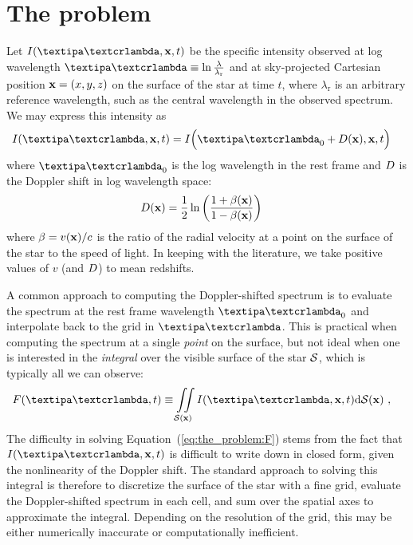 \documentclass[modern]{aastex631}
\begin{document}
\section{The problem}
\label{sec:the_problem}
%
Let $I(\lnlam, \x, t)$ be the specific intensity observed at log wavelength $\lnlam \equiv \ln\frac{\lambda}{\lambda_\mathrm{r}}$ and at sky-projected Cartesian position ${\mathbf{x}} = (x, y, z)$ on the surface of the star at time $t$, where $\lambda_\mathrm{r}$ is an arbitrary reference wavelength, such as the central wavelength in the observed spectrum.
We may express this intensity as
%
\begin{align}
    \label{eq:the_problem:Ixi}
    I(\lnlam, \x, t) & =
    I\Big(\lnlam_0 + \D(\x), \x, t\Big)
\end{align}
%
where $\lnlam_0$ is the log wavelength in the rest frame and $D$ is the Doppler shift in log wavelength space:
%
\begin{align}
    \label{eq:the_problem:D}
    D({\mathbf{x}})
     & =
    \frac{1}{2}\ln\left(
    \frac{1 + \beta({\mathbf{x}})}{1 - \beta({\mathbf{x}})}
    \right)
\end{align}
%
where $\beta = v({\mathbf{x}}) / c$ is the ratio of the radial velocity at a point on the surface of the star to the speed of light.
In keeping with the literature, we take positive values of $v$ (and $D$) to mean redshifts.

A common approach to computing the Doppler-shifted spectrum is to evaluate the spectrum at the rest frame wavelength $\lnlam_0$ and interpolate back to the grid in $\lnlam$. 
This is practical when computing the spectrum at a single \emph{point} on the surface, but not ideal when one is interested in the \emph{integral} over the visible surface of the star $\mathcal{S}$, which is typically all we can observe:
%
\begin{align}
    \label{eq:the_problem:F}
    F(\lnlam, t)
     & \equiv
    \iint\limits_{\Surf(\x)}
    I(\lnlam, \x, t)
    \mathrm{d}{\Surf(\x)}
    \quad,
\end{align}
%
The difficulty in solving Equation~(\ref{eq:the_problem:F}) stems from the fact that $I(\lnlam, \x, t)$ is difficult to write down in closed form, given the nonlinearity of the Doppler shift.
The standard approach to solving this integral is therefore to discretize the surface of the star with a fine grid, evaluate the Doppler-shifted spectrum in each cell, and sum over the spatial axes to approximate the integral. 
Depending on the resolution of the grid, this may be either numerically inaccurate or computationally inefficient.
\end{document}
